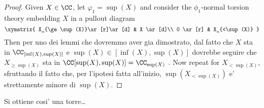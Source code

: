 \begin{proof}
Given $X\in \CC$, let $\varphi_1 = \sup(X)$ and consider the $\phi_1$\hyp{}normal torsion theory embedding $X$ in a pullout diagram
\[
\xymatrix{
X_{\ge \sup(X)}\ar[r]\ar[d] & X \ar[d]\\
0 \ar[r] & X_{<\sup(X)}
}
\]
Then per uno dei lemmi che dovremmo aver gia dimostrato, dal fatto che $X$ sta in $\CC_{[\inf(X),\sup(X)]}$ e $\sup(X) \in [\inf(X),\sup(X)]$ dovrebbe seguire che $X_{\ge \sup(X)}$ sta in $\CC[\sup(X),\sup(X)] = \CC_{\sup(X)}$
. Now repeat for $X_{<\sup(X)}$, sfruttando il fatto che, per l’ipotesi fatta all’inizio, $\sup(X_{<\sup(X)})$ e' strettamente minore di $\sup(X)$.
\end{proof}
Si ottiene cosi' una torre\dots